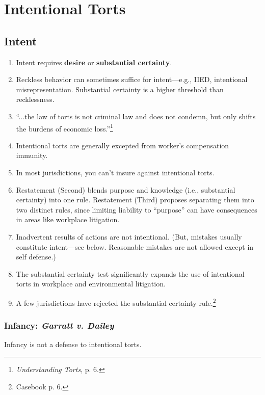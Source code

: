 \section{Intentional Torts}

\subsection{Intent}

\begin{enumerate}
    \item Intent requires \textbf{desire} or \textbf{substantial certainty}.
    \item Reckless behavior can sometimes suffice for intent---e.g., IIED, 
    intentional misrepresentation. Substantial certainty is a higher threshold 
    than recklessness.
    \item ``...the law of torts is not criminal law and does not condemn, but 
    only shifts the burdens of economic loss.''\footnote{\emph{Understanding 
    Torts}, p. 6.}
    \item Intentional torts are generally excepted from worker's compensation 
    immunity.
    \item In most jurisdictions, you can't insure against intentional torts.
    \item Restatement (Second) blends purpose and knowledge (i.e., substantial 
    certainty) into one rule. Restatement (Third) proposes separating them 
    into two distinct rules, since limiting liability to ``purpose'' can have 
    consequences in areas like workplace litigation.
    \item Inadvertent results of actions are not intentional. (But, mistakes 
    usually constitute intent---see below. Reasonable mistakes are not allowed 
    except in self defense.)
    \item The substantial certainty test significantly expands the use of 
    intentional torts in workplace and environmental litigation.
    \item A few jurisdictions have rejected the substantial certainty 
    rule.\footnote{Casebook p. 6.}
\end{enumerate}

\subsubsection{Infancy: \emph{Garratt v. Dailey}}

Infancy is not a defense to intentional torts.

